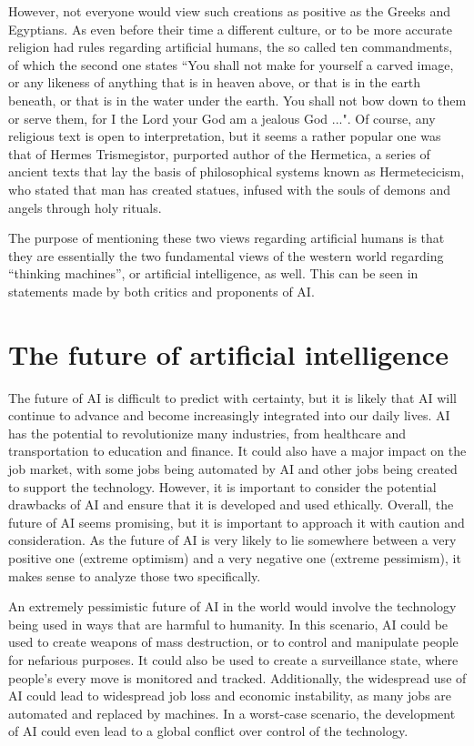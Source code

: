However, not everyone would view such creations as positive as the Greeks and Egyptians. As even before their 
time a different culture, or to be more accurate religion had rules regarding artificial humans, the so called 
ten commandments, of which the second one states “You shall not make for yourself a carved image, or any likeness 
of anything that is in heaven above, or that is in the earth beneath, or that is in the water under the earth. 
You shall not bow down to them or serve them, for I the Lord your God am a jealous God ...". Of course, any religious 
text is open to interpretation, but it seems a rather popular one was that of Hermes Trismegistor, purported author 
of the Hermetica, a series of ancient texts that lay the basis of philosophical systems known as Hermetecicism, 
who stated that man has created statues, infused with the souls of demons and angels through holy rituals.

The purpose of mentioning these two views regarding artificial humans is that they are essentially the 
two fundamental views of the western world regarding “thinking machines”, or artificial intelligence, 
as well. This can be seen in statements made by both critics and proponents of AI. \cite{Denkmaschinen}
\newpage
\section{The future of artificial intelligence}
The future of AI is difficult to predict with certainty,
but it is likely that AI will continue to advance and become 
increasingly integrated into our daily lives. AI has the potential 
to revolutionize many industries, from healthcare and transportation 
to education and finance. It could also have a major impact on the job 
market, with some jobs being automated by AI and other jobs being created 
to support the technology. However, it is important to consider the potential 
drawbacks of AI and ensure that it is developed and used ethically. Overall, 
the future of AI seems promising, but it is important to approach it with caution 
and consideration. As the future of AI is very likely to lie somewhere between a very 
positive one (extreme optimism) and a very negative one (extreme pessimism), it makes sense 
to analyze those two specifically.

An extremely pessimistic future of AI in the world would involve the 
technology being used in ways that are harmful to humanity. In this scenario, 
AI could be used to create weapons of mass destruction, or to control and manipulate 
people for nefarious purposes. It could also be used to create a surveillance state, 
where people's every move is monitored and tracked. Additionally, the widespread use of 
AI could lead to widespread job loss and economic instability, as many jobs are automated 
and replaced by machines. In a worst-case scenario, the development of AI could even lead 
to a global conflict over control of the technology.

